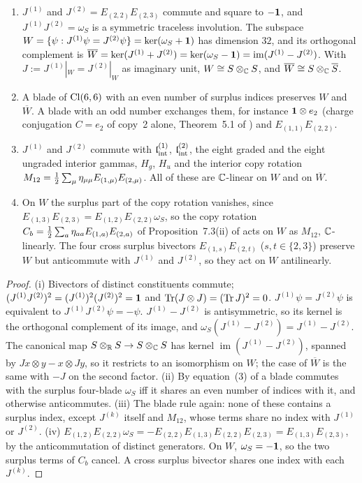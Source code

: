 \begin{proposition}
\label{e1:prop:W}
\begin{enumerate}[label=(\roman*),leftmargin=2.2em]
\item $J^{(1)}$ and $J^{(2)}=E_{(2,2)}E_{(2,3)}$ commute and square to $-\mathbf 1$, and $J^{(1)}J^{(2)}=\omega_S$ is a symmetric traceless involution. The
subspace $W=\{\psi:J^{(1)}\psi=J^{(2)}\psi\}=\ker(\omega_S+\mathbf 1)$ has dimension $32$, and its orthogonal complement is
$\overline W=\ker(J^{(1)}+J^{(2)})=\ker(\omega_S-\mathbf 1)=\operatorname{im}(J^{(1)}-J^{(2)})$. With $J:=J^{(1)}|_W=J^{(2)}|_W$ as imaginary unit,
$W\cong S\otimes_{\mathbb{C}} S$, and $\overline W\cong S\otimes_{\mathbb{C}}\overline S$.
\item A blade of $\mathrm{Cl}(6,6)$ with an even number of surplus indices preserves $W$ and $\overline W$. A blade with an odd number exchanges them,
for instance $\mathbf 1\otimes e_2$ (charge conjugation $C=e_2$ of copy~2 alone, Theorem~5.1 of \cite{ES17}) and $E_{(1,1)}E_{(2,2)}$.
\item $J^{(1)}$ and $J^{(2)}$ commute with $\mathfrak l_{\rm int}^{(1)}$, $\mathfrak l_{\rm int}^{(2)}$, the eight graded and the eight ungraded interior gammas, $H_g$, $H_u$ and the
interior copy rotation $M_{12}=\tfrac12\sum_\mu\eta_{\mu\mu}E_{(1,\mu)}E_{(2,\mu)}$. All of these are $\mathbb{C}$-linear on $W$ and on $\overline W$.
\item On $W$ the surplus part of the copy rotation vanishes, since $E_{(1,3)}E_{(2,3)}=E_{(1,2)}E_{(2,2)}\omega_S$, so the copy rotation
$C_b=\tfrac12\sum_a\eta_{aa}E_{(1,a)}E_{(2,a)}$ of Proposition~7.3(ii) of \cite{RE} acts on $W$ as $M_{12}$, $\mathbb{C}$-linearly. The four cross surplus bivectors $E_{(1,s)}E_{(2,t)}$
($s,t\in\{2,3\}$) preserve $W$ but anticommute with $J^{(1)}$ and $J^{(2)}$, so they act on $W$ antilinearly.
\end{enumerate}
\end{proposition}

\begin{proof}
(i) Bivectors of distinct constituents commute; $(J^{(1)}J^{(2)})^2=(J^{(1)})^2(J^{(2)})^2=\mathbf 1$ and $\operatorname{Tr}(J\otimes J)=(\operatorname{Tr} J)^2=0$. $J^{(1)}\psi=J^{(2)}\psi$ is
equivalent to $J^{(1)}J^{(2)}\psi=-\psi$. $J^{(1)}-J^{(2)}$ is antisymmetric, so its kernel is the orthogonal complement of its image, and
$\omega_S(J^{(1)}-J^{(2)})=J^{(1)}-J^{(2)}$. The canonical map $S\otimes_{\mathbb{R}} S\to S\otimes_{\mathbb{C}} S$ has kernel $\operatorname{im}(J^{(1)}-J^{(2)})$, spanned by
$Jx\otimes y-x\otimes Jy$, so it restricts to an isomorphism on $W$; the case of $\overline W$ is the same with $-J$ on the second factor. (ii)
By equation~(3) of \cite{ES17} a blade commutes with the surplus four-blade $\omega_S$ iff it shares an even number of indices with it, and
otherwise anticommutes. (iii) The blade rule again: none of these contains a surplus index, except $J^{(k)}$ itself and $M_{12}$, whose
terms share no index with $J^{(1)}$ or $J^{(2)}$. (iv) $E_{(1,2)}E_{(2,2)}\omega_S=-E_{(2,2)}E_{(1,3)}E_{(2,2)}E_{(2,3)}=E_{(1,3)}E_{(2,3)}$, by the anticommutation of distinct
generators. On $W$, $\omega_S=-\mathbf 1$, so the two surplus terms of $C_b$ cancel. A cross surplus bivector shares one index
with each $J^{(k)}$.
\end{proof}

